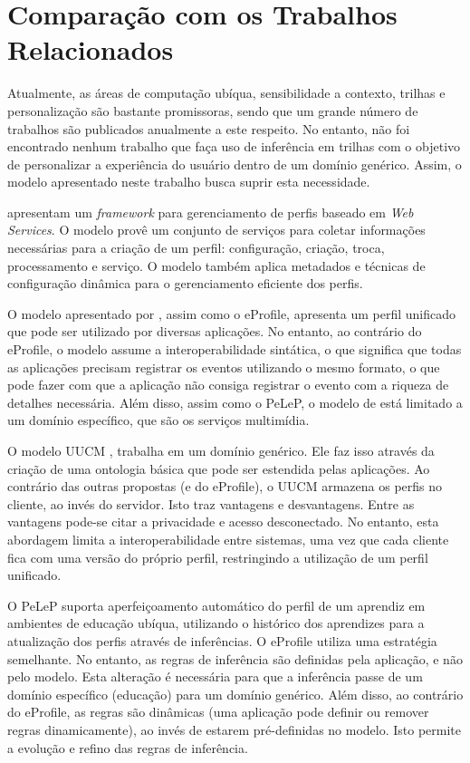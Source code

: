 
\section{Comparação com os Trabalhos Relacionados} \label{sec:contribuicoes}

Atualmente, as áreas de computação ubíqua, sensibilidade a contexto, trilhas e personalização são bastante promissoras, sendo que um grande número de trabalhos são publicados anualmente a este respeito. No entanto, não foi encontrado nenhum trabalho que faça uso de inferência em trilhas com o objetivo de personalizar a experiência do usuário dentro de um domínio genérico. Assim, o modelo apresentado neste trabalho busca suprir esta necessidade.

 apresentam um {\it framework} para gerenciamento de perfis baseado em {\it Web Services}. O modelo provê um conjunto de serviços para coletar informações necessárias para a criação de um perfil: configuração, criação, troca, processamento e serviço. O modelo também aplica metadados e técnicas de configuração dinâmica para o gerenciamento eficiente dos perfis.

O modelo apresentado por , assim como o eProfile, apresenta um perfil unificado que pode ser utilizado por diversas aplicações. No entanto, ao contrário do eProfile, o modelo assume a interoperabilidade sintática, o que significa que todas as aplicações precisam registrar os eventos utilizando o mesmo formato, o que pode fazer com que a aplicação não consiga registrar o evento com a riqueza de detalhes necessária. Além disso, assim como o PeLeP, o modelo de  está limitado a um domínio específico, que são os serviços multimídia.

O modelo UUCM \cite{niederee04}, trabalha em um domínio genérico. Ele faz isso através da criação de uma ontologia básica que pode ser estendida pelas aplicações. Ao contrário das outras propostas (e do eProfile), o UUCM armazena os perfis no cliente, ao invés do servidor. Isto traz vantagens e desvantagens. Entre as vantagens pode-se citar a privacidade e acesso desconectado. No entanto, esta abordagem limita a interoperabilidade entre sistemas, uma vez que cada cliente fica com uma versão do próprio perfil, restringindo a utilização de um perfil unificado.

O PeLeP \cite{pelep} suporta aperfeiçoamento automático do perfil de um aprendiz em ambientes de educação ubíqua, utilizando o histórico dos aprendizes para a atualização dos perfis através de inferências. O eProfile utiliza uma estratégia semelhante. No entanto, as regras de inferência são definidas pela aplicação, e não pelo modelo. Esta alteração é necessária para que a inferência passe de um domínio específico (educação) para um domínio genérico. Além disso, ao contrário do eProfile, as regras são dinâmicas (uma aplicação pode definir ou remover regras dinamicamente), ao invés de estarem pré-definidas no modelo. Isto permite a evolução e refino das regras de inferência.

